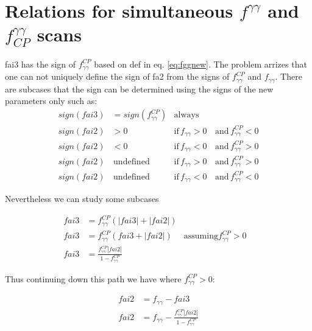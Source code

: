 \documentclass[10pt,a4paper]{article}
\begin{document}
\section{Relations for simultaneous $f^{\gamma\gamma}$ and $f^{\gamma\gamma}_{CP}$ scans }


fai3 has the sign of $f_{\gamma\gamma}^{CP}$ based on def in eq. \ref{eq:fggnew}. 
The problem arrizes that one can not uniquely define the sign of fa2 from the signs of $f_{\gamma\gamma}^{CP}$ and  $f_{\gamma\gamma}$. There are subcases that the sign can be determined using the signs of the new parameters only such as: 
\begin{equation}
\begin{align}
sign(fai3) &= sign(f_{\gamma\gamma}^{CP}) &\mathrm{always} \\
sign(fai2) &> 0 &\mathrm{if}\, f_{\gamma\gamma} > 0  \,&\mathrm{and }\, f_{\gamma\gamma}^{CP} < 0 \\
sign(fai2) &< 0 &\mathrm{if}\, f_{\gamma\gamma} < 0  \,&\mathrm{and }\, f_{\gamma\gamma}^{CP} > 0 \\
sign(fai2) &\,\mathrm{ undefined}  &\mathrm{if }\, f_{\gamma\gamma} > 0  \,&\mathrm{and }\, f_{\gamma\gamma}^{CP} > 0 \\
sign(fai2) &\,\mathrm{ undefined}  &\mathrm{if }\, f_{\gamma\gamma} < 0  \,&\mathrm{and }\, f_{\gamma\gamma}^{CP} < 0 
\end{align}\label{eq:signs}
\end{equation}

Nevertheless we can study some subcases


\begin{equation}\label{eq:newdepfggfcp}
\begin{align}
fai3 &= f_{\gamma\gamma}^{CP}(|fai3| +|fai2|) & \\
fai3 &= f_{\gamma\gamma}^{CP}(fai3 +|fai2|) &\mathrm{assuming } f_{\gamma\gamma}^{CP} > 0 & \\
fai3 &= \frac{f_{\gamma\gamma}^{CP}|fai2|}{1-f_{\gamma\gamma}^{CP}} &
\end{align}
\end{equation}

Thus continuing down this path we have where $f_{\gamma\gamma}^{CP} > 0$: 


\begin{equation}
\begin{align}
fai2 &= f_{\gamma\gamma} - fai3 \\
fai2 &= f_{\gamma\gamma}  - \frac{f_{\gamma\gamma}^{CP}|fai2|}{1-f_{\gamma\gamma}^{CP}}  
\end{align}\label{eq:newdepfggfcpfa2}
\end{equation}
\end{document}
